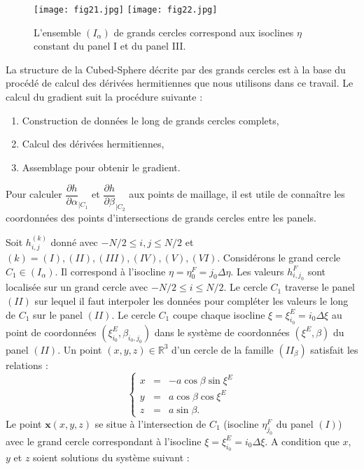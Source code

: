 \begin{figure}
\begin{center}
\texttt{[image: fig21.jpg]}
\texttt{[image: fig22.jpg]}
\end{center}
\caption{L'ensemble $(I_{\alpha})$ de grands cercles correspond aux isoclines $\eta$ constant du panel I et du panel III.}
\end{figure}


La structure de la Cubed-Sphere décrite par des grands cercles est à la base du procédé de calcul des dérivées hermitiennes que nous utilisons dans ce travail. Le calcul du gradient suit la procédure suivante :
\begin{enumerate}
\item Construction de données le long de grands cercles complets,
\item Calcul des dérivées hermitiennes,
\item Assemblage pour obtenir le gradient.
\end{enumerate}

Pour calculer $\dfrac{\partial h}{\partial \alpha}_{|C_1}$ et $\dfrac{\partial h}{\partial \beta}_{|C_2}$ aux points de maillage, il est utile de connaître les coordonnées des points d'intersections de grands cercles entre les panels.

Soit $h_{i,j}^{(k)}$ donné avec $-N/2 \leq i,j \leq N/2$ et $(k) = (I), (II), (III), (IV), (V), (VI)$. Considérons le grand cercle $C_1 \in (I_{\alpha})$. Il correspond à l'isocline $\eta = \eta_0^F = j_0 \Delta \eta$. Les valeurs $h_{i,j_0}^F$ sont localisée sur un grand cercle avec $-N/2 \leq i \leq N/2$. Le cercle $C_1$ traverse le panel $(II)$ sur lequel il faut interpoler les données pour compléter les valeurs le long de $C_1$ sur le panel $(II)$. Le cercle $C_1$ coupe chaque isocline $\xi = \xi^E_{i_0} = i_0 \Delta \xi$ au point de coordonnées $(\xi_{i_0}^E, \beta_{i_0,j_0})$ dans le système de coordonnées $(\xi^E, \beta)$ du panel $(II)$. Un point $(x,y,z)\in \mathbb{R}^3$ d'un cercle de la famille $(II_{\beta})$ satisfait les relations :
\begin{equation}
\left\lbrace
\begin{array}{rcl}
x & = & - a \cos \beta \sin \xi^E \\
y & = & a \cos \beta \cos \xi^E \\
z & = & a \sin \beta.
\end{array}
\right.
\end{equation}
Le point $\mathbf{x}(x,y,z)$ se situe à l'intersection de $C_1$ (isocline $\eta^F_{j_0}$ du panel $(I)$) avec le grand cercle correspondant à l'isocline $\xi = \xi^E_{i_0} = i_0 \Delta \xi$. A condition que $x$, $y$ et $z$ soient solutions du système suivant :

